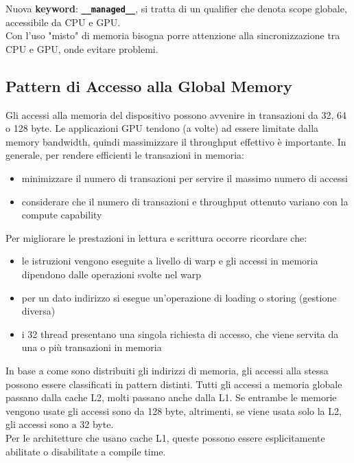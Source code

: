 Nuova \textbf{keyword}: \textbf{\texttt{\_\_managed\_\_}}, si tratta di un qualifier che denota scope globale, accessibile da CPU e GPU.\\

Con l'uso "misto" di memoria bisogna porre attenzione alla sincronizzazione tra CPU e GPU, onde evitare problemi.

\newpage

\subsection{Pattern di Accesso alla Global Memory}

Gli accessi alla memoria del dispositivo possono avvenire in transazioni da 32, 64 o 128 byte. Le applicazioni GPU tendono (a volte) ad essere limitate dalla memory bandwidth, quindi massimizzare il throughput effettivo è importante. In generale, per rendere efficienti le transazioni in memoria:
\begin{itemize}
	\item minimizzare il numero di transazioni per servire il massimo numero di accessi 
	\item considerare che il numero di transazioni e throughput ottenuto variano con la compute capability
\end{itemize}

Per migliorare le prestazioni in lettura e scrittura occorre ricordare che: 
\begin{itemize}
	\item le istruzioni vengono eseguite a livello di warp e gli accessi in memoria dipendono dalle operazioni svolte nel warp
	\item per un dato indirizzo si esegue un'operazione di loading o storing (gestione diversa)
	\item i 32 thread presentano una singola richiesta di accesso, che viene servita da una o più transazioni in memoria
\end{itemize}

In base a come sono distribuiti gli indirizzi di memoria, gli accessi alla stessa possono essere classificati in pattern distinti. Tutti gli accessi a memoria globale passano dalla cache L2, molti passano anche dalla L1. Se entrambe le memorie vengono usate gli accessi sono da 128 byte, altrimenti, se viene usata solo la L2, gli accessi sono a 32 byte. \\
Per le architetture che usano cache L1, queste possono essere esplicitamente abilitate o disabilitate a compile time.\\

